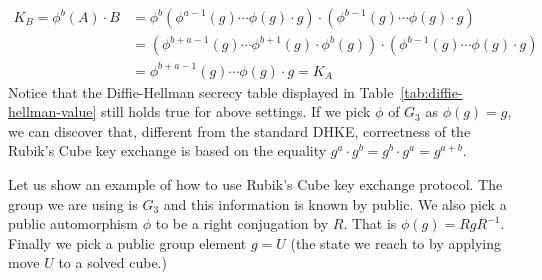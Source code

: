 \begin{align*}
    K_B = \phi^b(A) \cdot B & = \phi^b(\phi^{a - 1}(g) \cdots \phi(g) \cdot g) \cdot ( \phi^{b - 1}(g) \cdots \phi(g) \cdot g) \\ 
    & = (\phi^{b + a - 1}(g) \cdots \phi^{b + 1}(g) \cdot \phi^b(g)) \cdot ( \phi^{b - 1}(g) \cdots \phi(g) \cdot g) \\
    & = \phi^{b + a - 1}(g) \cdots \phi(g) \cdot g = K_A
\end{align*}
Notice that the Diffie-Hellman secrecy table displayed in Table~\ref{tab:diffie-hellman-value} still holds true for above settings. If we pick $\phi$ of $G_3$ as $\phi(g) = g$, we can discover that, different from the standard DHKE, correctness of the Rubik's Cube key exchange is based on the equality $g^a \cdot g^b = g^b \cdot g^a = g^{a+b}$.
\par Let us show an example of how to use Rubik's Cube key exchange protocol. The group we are using is $G_3$ and this information is known by public. We also pick a public automorphism $\phi$ to be a right conjugation by $R$. That is $\phi(g) = RgR^{-1}$. Finally we pick a public group element $g = U$ (the state we reach to by applying move $U$ to a solved cube.) 
